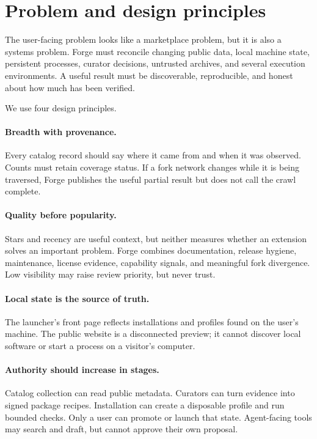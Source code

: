 \documentclass[10pt,twocolumn]{article}
\begin{document}
\section{Problem and design principles}

The user-facing problem looks like a marketplace problem, but it is also a systems problem. Forge must reconcile changing public data, local machine state, persistent processes, curator decisions, untrusted archives, and several execution environments. A useful result must be discoverable, reproducible, and honest about how much has been verified.

We use four design principles.

\paragraph{Breadth with provenance.} Every catalog record should say where it came from and when it was observed. Counts must retain coverage status. If a fork network changes while it is being traversed, Forge publishes the useful partial result but does not call the crawl complete.

\paragraph{Quality before popularity.} Stars and recency are useful context, but neither measures whether an extension solves an important problem. Forge combines documentation, release hygiene, maintenance, license evidence, capability signals, and meaningful fork divergence. Low visibility may raise review priority, but never trust.

\paragraph{Local state is the source of truth.} The launcher's front page reflects installations and profiles found on the user's machine. The public website is a disconnected preview; it cannot discover local software or start a process on a visitor's computer.\cite{readme,profiles}

\paragraph{Authority should increase in stages.} Catalog collection can read public metadata. Curators can turn evidence into signed package recipes. Installation can create a disposable profile and run bounded checks. Only a user can promote or launch that state. Agent-facing tools may search and draft, but cannot approve their own proposal.\cite{configs,installation}
\end{document}

